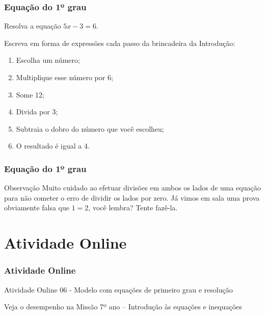 \documentclass[brazil, notheorems, 10pt]{beamer}
\begin{document}
\begin{frame}
\frametitle{Equação do 1º grau} %
\begin{Exem}
Resolva a equação $5x - 3 = 6$.
\end{Exem}

\begin{Exem}
Escreva em forma de expressões cada passo da brincadeira da
Introdução:
\begin{enumerate}
	\item Escolha um número;
	\item Multiplique esse número por 6;
	\item Some 12;
	\item Divida por 3;
	\item Subtraia o dobro do número que você escolheu;
	\item O resultado é igual a 4.
\end{enumerate}
\end{Exem}

\end{frame}




\begin{frame}
\frametitle{Equação do 1º grau} %
\begin{block}{Observação}
Muito cuidado ao efetuar divisões em ambos os lados de uma equação
para não cometer o erro de dividir os lados por zero. Já vimos em
sala uma prova obviamente falsa que $1=2$, você lembra? Tente
fazê-la.
\end{block}

\end{frame}




\section{Atividade Online}
\begin{frame}
\frametitle{Atividade Online} %

{Atividade Online 06 - Modelo com equações de primeiro grau e
resolução}



Veja o desempenho na Missão 7º ano -- Introdução às equações e
inequações

\end{frame}
\end{document}
